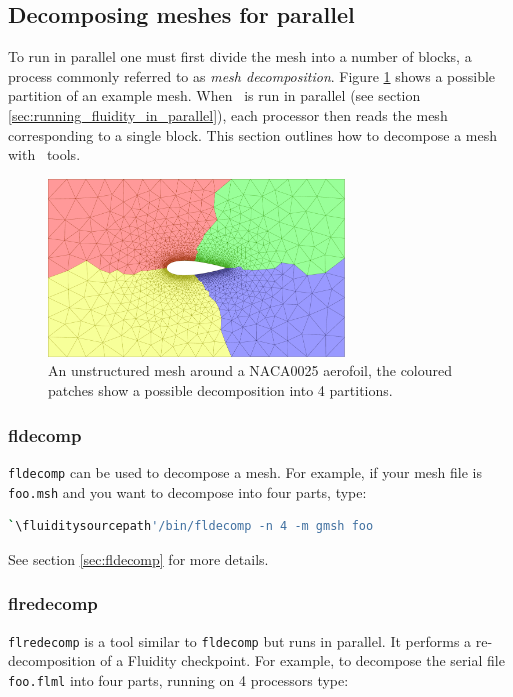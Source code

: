 \subsection{Decomposing meshes for parallel}
\label{decomp_meshes_parallel}
To run in parallel one must first divide the mesh into a number of blocks, a process
commonly referred to as \emph{mesh decomposition}. Figure \ref{fig:NACA0025_mesh_with_partitions}
shows a possible partition of an example mesh. When \fluidity\ is run in parallel (see section
\ref{sec:running_fluidity_in_parallel}), each processor then reads the mesh corresponding to a
single block. This section outlines how to decompose a mesh with \fluidity\ tools.
\begin{figure}[htbp]
 \centering
  \includegraphics[width=0.7\textwidth]{misc_images/NACA0025_mesh_with_partitions.pdf}
  \caption{An unstructured mesh around a NACA0025 aerofoil, the coloured patches show a
           possible decomposition into 4 partitions.}
  \label{fig:NACA0025_mesh_with_partitions}
\end{figure}

\subsubsection{fldecomp}
\label{mesh!meshing tools!fldecomp}

\lstinline[language=bash]+fldecomp+ can be used to decompose a mesh. For example, if your mesh
file is \lstinline[language=bash]+foo.msh+ and you want to decompose into four parts, type:
\begin{lstlisting}[language = Bash]
`\fluiditysourcepath'/bin/fldecomp -n 4 -m gmsh foo
\end{lstlisting}
See section \ref{sec:fldecomp} for more details.

\subsubsection{flredecomp}
\label{mesh!meshing tools!flredecomp}
\lstinline[language=bash]+flredecomp+ is a tool similar to \lstinline[language=bash]+fldecomp+ but runs in parallel. 
It performs a re-decomposition of a Fluidity checkpoint.
For example, to decompose the serial file \lstinline+foo.flml+
into four parts, running on 4 processors type:

